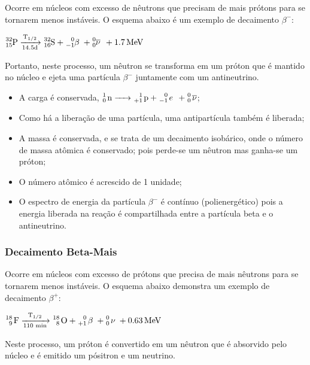 \documentclass[11pt,a4paper]{article}
\newcounter{exemplo}
\begin{document}
                Ocorre em núcleos com excesso de nêutrons que precisam de mais prótons para se tornarem menos instáveis. O esquema abaixo é um exemplo de decaimento $\beta^-$:

                \begin{center}
                    $\ce{^{32}_{15}P ->[{T_{1/2}}][{14.5d}] ^{32}_{16}S + ^{0}_{-1}\beta \; + ^{0}_{0}\overline{\nu} \; + 1.7 MeV}$
                \end{center}

                Portanto, neste processo, um nêutron se transforma em um próton que é mantido no núcleo e ejeta uma partícula $\beta^-$ juntamente com um antineutrino.

                \begin{itemize}
                    \item A carga é conservada, $\ce{^{1}_{0} n -> ^{1}_{+1} p + ^{0}_{-1} e \; + ^{0}_{0} \overline{\nu}}$;
                    \item Como há a liberação de uma partícula, uma antipartícula também é liberada; 
                    \item A massa é conservada, e se trata de um decaimento isobárico, onde o número de massa atômica é conservado; pois perde-se um nêutron mas ganha-se um próton;
                    \item O número atômico é acrescido de 1 unidade; 
                    \item O espectro de energia da partícula $\beta^-$ é contínuo (polienergético) pois a energia liberada na reação é compartilhada entre a partícula beta e o antineutrino.
                \end{itemize}

            \subsubsection{Decaimento Beta-Mais}

                Ocorre em núcleos com excesso de prótons que precisa de mais nêutrons para se tornarem menos instáveis. O esquema abaixo demonstra um exemplo de decaimento $\beta^+$:

                \begin{center}
                    $\ce{^{18}_{9} F ->[{T_{1/2}}][{110 min}] ^{18}_{8} O + ^{0}_{+1} \beta \; + ^{0}_{0} \nu \; + 0.63 MeV}$
                \end{center}

                Neste processo, um próton é convertido em um nêutron que é absorvido pelo núcleo e é emitido um pósitron e um neutrino.
\end{document}
